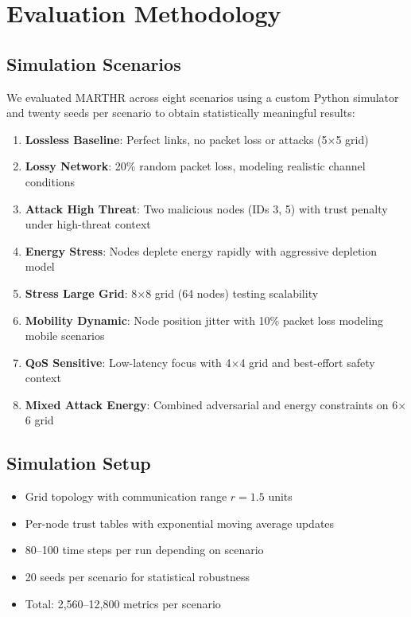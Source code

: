\documentclass[conference]{IEEEtran}
\begin{document}
\section{Evaluation Methodology}

\subsection{Simulation Scenarios}

We evaluated MARTHR across eight scenarios using a custom Python simulator and twenty seeds per scenario to obtain statistically meaningful results:

\begin{enumerate}
\item \textbf{Lossless Baseline}: Perfect links, no packet loss or attacks (5$\times$5 grid)
\item \textbf{Lossy Network}: 20\% random packet loss, modeling realistic channel conditions
\item \textbf{Attack High Threat}: Two malicious nodes (IDs 3, 5) with trust penalty under high-threat context
\item \textbf{Energy Stress}: Nodes deplete energy rapidly with aggressive depletion model
\item \textbf{Stress Large Grid}: 8$\times$8 grid (64 nodes) testing scalability
\item \textbf{Mobility Dynamic}: Node position jitter with 10\% packet loss modeling mobile scenarios
\item \textbf{QoS Sensitive}: Low-latency focus with 4$\times$4 grid and best-effort safety context
\item \textbf{Mixed Attack Energy}: Combined adversarial and energy constraints on 6$\times$6 grid
\end{enumerate}

\subsection{Simulation Setup}

\begin{itemize}
\item Grid topology with communication range $r = 1.5$ units
\item Per-node trust tables with exponential moving average updates
\item 80--100 time steps per run depending on scenario
\item 20 seeds per scenario for statistical robustness
\item Total: 2,560--12,800 metrics per scenario
\end{itemize}
\end{document}
